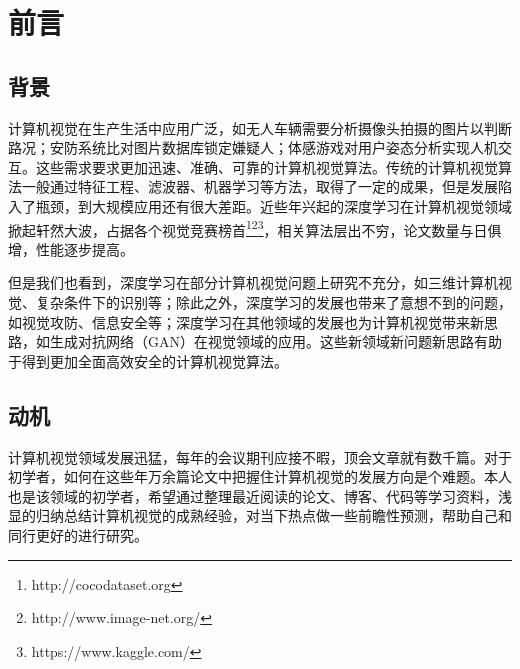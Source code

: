 \section{前言}
\subsection{背景}
计算机视觉在生产生活中应用广泛，如无人车辆需要分析摄像头拍摄的图片以判断路况\cite{sheth2018design, cardarelli2017cooperative}；安防系统比对图片数据库锁定嫌疑人\cite{li2015convolutional,yang2016wider,jiang2017face,farfade2015multi}；体感游戏对用户姿态分析实现人机交互\cite{belagiannis2017recurrent,lifshitz2016human}。这些需求要求更加迅速、准确、可靠的计算机视觉算法。传统的计算机视觉算法一般通过特征工程、滤波器、机器学习等方法\cite{zuo2018learning,jordan2015machine,lison2015introduction,meyer2015support}，取得了一定的成果，但是发展陷入了瓶颈，到大规模应用还有很大差距。近些年兴起的深度学习在计算机视觉领域掀起轩然大波，占据各个视觉竞赛榜首\footnote{http://cocodataset.org}\footnote{http://www.image-net.org/}\footnote{https://www.kaggle.com/}，相关算法层出不穷，论文数量与日俱增，性能逐步提高。

但是我们也看到，深度学习在部分计算机视觉问题上研究不充分，如三维计算机视觉\cite{song2015sun,song2016deep,whelan2015real}、复杂条件下的识别\cite{wu2016robust}等；除此之外，深度学习的发展也带来了意想不到的问题，如视觉攻防、信息安全\cite{whelan2015real,rao2015computer}等；深度学习在其他领域的发展也为计算机视觉带来新思路，如生成对抗网络（GAN）\cite{faubel2016cilia,goodfellow2014generative}在视觉领域的应用。这些新领域新问题新思路有助于得到更加全面高效安全的计算机视觉算法。

\subsection{动机}
计算机视觉领域发展迅猛，每年的会议期刊应接不暇，顶会文章就有数千篇。对于初学者，如何在这些年万余篇论文中把握住计算机视觉的发展方向是个难题。本人也是该领域的初学者，希望通过整理最近阅读的论文、博客、代码等学习资料，浅显的归纳总结计算机视觉的成熟经验，对当下热点做一些前瞻性预测，帮助自己和同行更好的进行研究。
